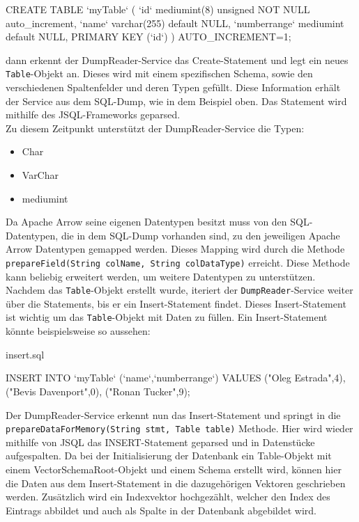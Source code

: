 \begin{terminalblock}
  \begin{textcode}
CREATE TABLE `myTable` (
  `id` mediumint(8) unsigned NOT NULL auto_increment,
  `name` varchar(255) default NULL,
  `numberrange` mediumint default NULL,
  PRIMARY KEY (`id`)
) AUTO_INCREMENT=1;
  \end{textcode}
\end{terminalblock}

dann erkennt der DumpReader-Service das Create-Statement und legt ein neues \texttt{Table}-Objekt an. Dieses wird mit einem spezifischen Schema, sowie den verschiedenen Spaltenfelder und deren Typen gefüllt.
Diese Information erhält der Service aus dem SQL-Dump, wie in dem Beispiel oben.
Das Statement wird mithilfe des JSQL-Frameworks geparsed. \\

Zu diesem Zeitpunkt unterstützt der DumpReader-Service die Typen:

\begin{itemize}
 \item Char
 \item VarChar
 \item mediumint
\end{itemize}

Da Apache Arrow seine eigenen Datentypen besitzt muss von den SQL-Datentypen, die in dem SQL-Dump vorhanden sind, zu den jeweiligen Apache Arrow Datentypen gemapped werden. 
Dieses Mapping wird durch die Methode \texttt{prepareField(String colName, String colDataType)} erreicht.
Diese Methode kann beliebig erweitert werden, um weitere Datentypen zu unterstützen.\\
Nachdem das \texttt{Table}-Objekt erstellt wurde, iteriert der \texttt{DumpReader}-Service weiter über die Statements, bis er ein Insert-Statement findet. Dieses Insert-Statement ist wichtig um das \texttt{Table}-Objekt mit Daten zu füllen.
Ein Insert-Statement könnte beispielsweise so aussehen:\\

\begin{terminalblock}{insert.sql}
  \begin{textcode}
INSERT INTO `myTable` (`name`,`numberrange`)
VALUES
  ("Oleg Estrada",4),
  ("Bevis Davenport",0),
  ("Ronan Tucker",9);
  \end{textcode}
\end{terminalblock}

Der DumpReader-Service erkennt nun das Insert-Statement und springt in die \\ \texttt{prepareDataForMemory(String stmt, Table table)} Methode. Hier wird wieder mithilfe von JSQL das INSERT-Statement geparsed und in Datenstücke aufgespalten.
Da bei der Initialisierung der Datenbank ein Table-Objekt mit einem VectorSchemaRoot-Objekt und einem Schema erstellt wird, können hier die Daten aus dem Insert-Statement in die dazugehörigen Vektoren geschrieben werden.
Zusätzlich wird ein Indexvektor hochgezählt, welcher den Index des Eintrags abbildet und auch als Spalte in der Datenbank abgebildet wird.\\\\

